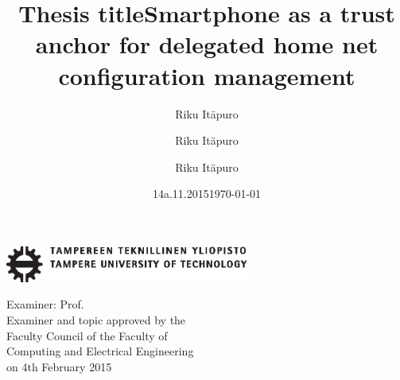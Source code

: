 \documentclass[12pt,a4paper,english]{tutthesis}
\author{Riku Itäpuro}
\title{Thesis title}      %
\author{Riku Itäpuro}
\title{Smartphone as a trust anchor for delegated home net configuration management}
\author{Riku Itäpuro}
\date{14a.11.2015}
\title{}
\begin{document}



\newpage             %

 \pagestyle{headings}
 \thispagestyle{empty}
\date\today
 \vspace*{-.5cm}\noindent
 \includegraphics[width=8cm]{tty_tut_logo}   %

\vspace{6.8cm}
\maketitle
\vspace{6.7cm} %
 
\begin{flushright}  
  \begin{minipage}[c]{6.8cm}
    \begin{spacing}{1.0}
      \textsf{Examiner: Prof. \@examiner}\\
      \textsf{Examiner and topic approved by the}\\ 
      \textsf{Faculty Council of the Faculty of} \\
      \textsf{Computing and Electrical Engineering} \\
      \textsf{on 4th February 2015}\\
    \end{spacing}
  \end{minipage}
\end{flushright}


\if@twoside
\clearpage
\fi
\end{document}
